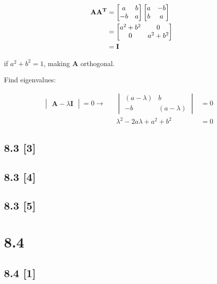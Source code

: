 \documentclass{article}
\begin{document}
\begin{align}
    \label{eq:3}
    && \textbf{AA\textsuperscript{T}} &= \begin{bmatrix} 
    a & b\\
    -b & a
    \end{bmatrix} \begin{bmatrix} 
    a & -b\\
    b & a
    \end{bmatrix}
    \\
    \label{eq:4}
    && &= \begin{bmatrix}
    a^2+b^2 & 0\\
    0 & a^2+b^2
    \end{bmatrix}
    \\
    \label{eq:5}
    && &= \textbf{I}
\end{align}

if $a^2+b^2=1$, making \textbf{A} orthogonal.

Find eigenvalues:

\begin{align}
    \label{eq:6}
    \begin{vmatrix}
    \textbf{A}-\lambda\textbf{I}
    \end{vmatrix} = 0 \rightarrow && \begin{vmatrix}
    (a-\lambda) & b\\
    -b & (a-\lambda)
    \end{vmatrix} &= 0
    \\
    \label{eq:7}
    && \lambda ^2 -2a \lambda +a^2 + b^2 &= 0
\end{align}

\subsection*{8.3 [3]}
\subsection*{8.3 [4]}
\subsection*{8.3 [5]}

\newpage

\section*{8.4}
\setcounter{equation}{0}

\subsection*{8.4 [1]}
\end{document}
